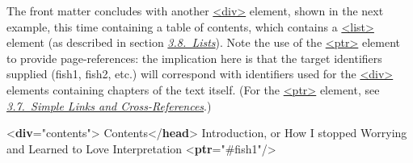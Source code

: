 The front matter concludes with another \hyperref[TEI.div]{<div>} element, shown in the next example, this time containing a table of contents, which contains a \hyperref[TEI.list]{<list>} element (as described in section \textit{\hyperref[COLI]{3.8.\ Lists}}). Note the use of the \hyperref[TEI.ptr]{<ptr>} element to provide page-references: the implication here is that the target identifiers supplied (fish1, fish2, etc.) will correspond with identifiers used for the \hyperref[TEI.div]{<div>} elements containing chapters of the text itself. (For the \hyperref[TEI.ptr]{<ptr>} element, see \textit{\hyperref[COXR]{3.7.\ Simple Links and Cross-References}}.) \par\bgroup{}\exampleFont \begin{shaded}\noindent\mbox{}{<\textbf{div}\hspace*{1em}{type}="{contents}">}\mbox{}\newline 
{}Contents{</\textbf{head}>}\mbox{}\newline 
{}\mbox{}\newline 
\hspace*{1em}Introduction, or How I stopped Worrying and Learned to Love\mbox{}\newline 
\hspace*{1em}\hspace*{1em}\hspace*{1em}\hspace*{1em} Interpretation {<\textbf{ptr}\hspace*{1em}{target}="{\#fish1}"/>}\mbox{}\newline 

\end{shaded}
